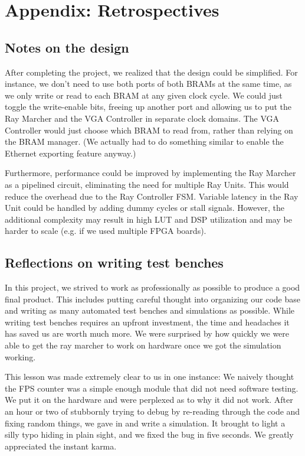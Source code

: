 \documentclass[conference]{IEEEtran}
\begin{document}
\section*{Appendix: Retrospectives}

\subsection{Notes on the design}

After completing the project, we realized that the design could be simplified. For instance, we don't need to use both ports of both BRAMs at the same time, as we only write or read to each BRAM at any given clock cycle. We could just toggle the write-enable bits, freeing up another port and allowing us to put the Ray Marcher and the VGA Controller in separate clock domains. The VGA Controller would just choose which BRAM to read from, rather than relying on the BRAM manager. (We actually had to do something similar to enable the Ethernet exporting feature anyway.)

Furthermore, performance could be improved by implementing the Ray Marcher as a pipelined circuit, eliminating the need for multiple Ray Units. This would reduce the overhead due to the Ray Controller FSM. Variable latency in the Ray Unit could be handled by adding dummy cycles or stall signals. However, the additional complexity may result in high LUT and DSP utilization and may be harder to scale (e.g. if we used multiple FPGA boards).

\subsection{Reflections on writing test benches}

In this project, we strived to work as professionally as possible to produce a good final product. This includes putting careful thought into organizing our code base and writing as many automated test benches and simulations as possible. While writing test benches requires an upfront investment, the time and headaches it has saved us are worth much more. We were surprised by how quickly we were able to get the ray marcher to work on hardware once we got the simulation working.

This lesson was made extremely clear to us in one instance: We naively thought the FPS counter was a simple enough module that did not need software testing. We put it on the hardware and were perplexed as to why it did not work. After an hour or two of stubbornly trying to debug by re-reading through the code and fixing random things, we gave in and write a simulation. It brought to light a silly typo hiding in plain sight, and we fixed the bug in five seconds. We greatly appreciated the instant karma.
\end{document}
